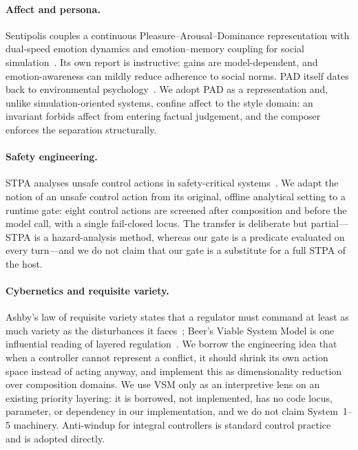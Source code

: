 \paragraph{Affect and persona.} Sentipolis couples a continuous
Pleasure--Arousal--Dominance representation with dual-speed emotion dynamics
and emotion--memory coupling for social simulation~\cite{sentipolis2026}. Its
own report is instructive: gains are model-dependent, and emotion-awareness can
mildly reduce adherence to social norms. PAD itself dates back to environmental
psychology~\cite{mehrabian1974}. We adopt PAD as a representation and, unlike
simulation-oriented systems, confine affect to the style domain: an invariant
forbids affect from entering factual judgement, and the composer enforces the
separation structurally.

\paragraph{Safety engineering.} STPA analyses unsafe control actions in
safety-critical systems~\cite{leveson2011,leveson2018}. We adapt the notion of
an unsafe control action from its original, offline analytical setting to a
runtime gate: eight control actions are screened after composition and before
the model call, with a single fail-closed locus. The transfer is deliberate but
partial---STPA is a hazard-analysis method, whereas our gate is a predicate
evaluated on every turn---and we do not claim that our gate is a substitute for
a full STPA of the host.

\paragraph{Cybernetics and requisite variety.} Ashby's law of requisite variety
states that a regulator must command at least as much variety as the
disturbances it faces~\cite{ashby1956}; Beer's Viable System Model is one
influential reading of layered regulation~\cite{beer1972}. We borrow the
engineering idea that when a controller cannot represent a conflict, it should
shrink its own action space instead of acting anyway, and implement this as
dimensionality reduction over composition domains. We use VSM only as an
interpretive lens on an existing priority layering: it is borrowed, not
implemented, has no code locus, parameter, or dependency in our implementation,
and we do not claim System~1--5 machinery. Anti-windup for integral controllers
is standard control practice~\cite{astrom2006} and is adopted directly.

